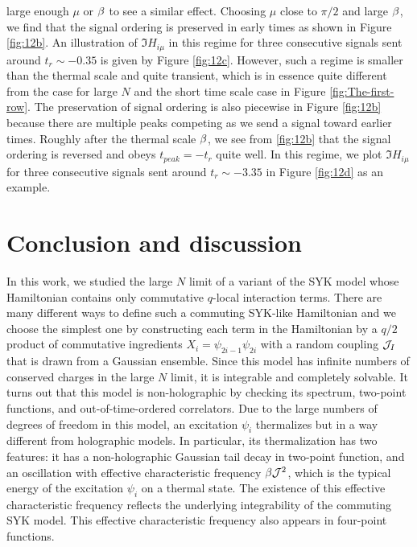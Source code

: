 \documentclass[11pt]{article}
\renewcommand{\>}{\rangle}
\newcommand{\<}{\langle}
\begin{document}
large enough $\mu$ or $\beta$ to see a similar effect. Choosing $\mu$
close to $\pi/2$ and large $\beta$, we find that the signal ordering
is preserved in early times as shown in Figure \ref{fig:12b}. An
illustration of $\Im H_{i\mu}$ in this regime for three consecutive
signals sent around $t_{r}\sim-0.35$ is given by Figure \ref{fig:12c}.
However, such a regime is smaller than the thermal scale and quite transient,
which is in essence quite different from the case for large $N$ and the
short time scale case in Figure \ref{fig:The-first-row}. The preservation
of signal ordering is also piecewise in Figure \ref{fig:12b} because
there are multiple peaks competing as we send a signal toward earlier
times. Roughly after the thermal scale $\beta$, we see from \ref{fig:12b}
that the signal ordering is reversed and obeys $t_{peak}=-t_{r}$
quite well. In this regime, we plot $\Im H_{i\mu}$ for three consecutive
signals sent around $t_{r}\sim-3.35$ in Figure \ref{fig:12d} as
an example.

\section{Conclusion and discussion\label{sec:Conclusion-and-discussion}}

In this work, we studied the large $N$ limit of a variant of the SYK
model whose Hamiltonian contains only commutative $q$-local interaction
terms. There are many different ways to define such a commuting SYK-like
Hamiltonian and we choose the simplest one by constructing each term
in the Hamiltonian by a $q/2$ product of commutative ingredients
$X_{i}=\psi_{2i-1}\psi_{2i}$ with a random coupling $\mathcal{J}_{I}$ that
is drawn from a Gaussian ensemble. Since this model has infinite numbers
of conserved charges in the large $N$ limit, it is integrable and completely
solvable. It turns out that this model is non-holographic by checking
its spectrum, two-point functions, and out-of-time-ordered correlators. Due to the large numbers of degrees of freedom in this model, an excitation $\psi_i$ thermalizes but in a way different from holographic models. In particular, its thermalization has two features: it has a non-holographic Gaussian tail decay in two-point function, and an oscillation with effective characteristic frequency $\beta\mathcal{J}^2$, which is the typical energy of the excitation $\psi_i$ on a thermal state. The existence of this effective characteristic frequency reflects the underlying integrability of the commuting SYK model. This effective characteristic frequency also appears in four-point functions.
\end{document}
